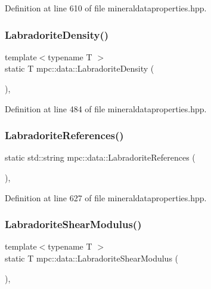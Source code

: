 Definition at line 610 of file mineraldataproperties.\+hpp.

\mbox{\label{namespacempc_1_1data_ad99c2afbd59be4eacaebeede81e18ad2}} 
\subsubsection{\texorpdfstring{Labradorite\+Density()}{LabradoriteDensity()}}
{\footnotesize\ttfamily template$<$typename T $>$ \\
static T mpc\+::data\+::\+Labradorite\+Density (\begin{DoxyParamCaption}{ }\end{DoxyParamCaption})\hspace{0.3cm}{\ttfamily [inline]}, {\ttfamily [static]}}



Definition at line 484 of file mineraldataproperties.\+hpp.

\mbox{\label{namespacempc_1_1data_a030b6ce7231ccfb0e3ac4fdc872edcbf}} 
\subsubsection{\texorpdfstring{Labradorite\+References()}{LabradoriteReferences()}}
{\footnotesize\ttfamily static std\+::string mpc\+::data\+::\+Labradorite\+References (\begin{DoxyParamCaption}{ }\end{DoxyParamCaption})\hspace{0.3cm}{\ttfamily [inline]}, {\ttfamily [static]}}



Definition at line 627 of file mineraldataproperties.\+hpp.

\mbox{\label{namespacempc_1_1data_a0129edf78d76750f848b0d8e973528ef}} 
\subsubsection{\texorpdfstring{Labradorite\+Shear\+Modulus()}{LabradoriteShearModulus()}}
{\footnotesize\ttfamily template$<$typename T $>$ \\
static T mpc\+::data\+::\+Labradorite\+Shear\+Modulus (\begin{DoxyParamCaption}{ }\end{DoxyParamCaption})\hspace{0.3cm}{\ttfamily [inline]}, {\ttfamily [static]}}




